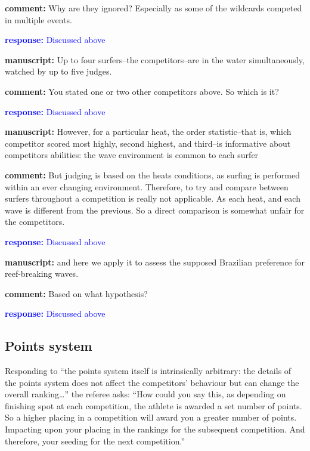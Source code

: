 \documentclass[12pt]{article}
\begin{document}
{\bf comment: } Why are they ignored? Especially as some of the wildcards competed in multiple events.

\textcolor{blue}{{\bf response: } Discussed above}


\rule{0mm}{10mm}


{\bf manuscript: } Up to four surfers--the competitors--are in the water simultaneously,
watched by up to five judges.

{\bf comment: } You stated one or two other competitors above. So which is it?

\textcolor{blue}{{\bf response: } Discussed above}

\rule{0mm}{10mm}


{\bf manuscript: } However, for a particular heat, the order statistic--that is, which
competitor scored most highly, second highest, and third--is
informative about competitors abilities: the wave environment is
common to each surfer

{\bf  comment: } But judging is based on the heats conditions, as surfing is performed
within an ever changing environment. Therefore, to try and compare
between surfers throughout a competition is really not applicable. As
each heat, and each wave is different from the previous. So a direct
comparison is somewhat unfair for the competitors.

\textcolor{blue}{{\bf response: } Discussed above}

\rule{0mm}{10mm}

{\bf manuscript: }  and here we apply it to assess the supposed Brazilian preference for
reef-breaking waves.

{\bf comment: } Based on what hypothesis?

\textcolor{blue}{{\bf response: } Discussed above}


\subsection*{Points system}

Responding to ``the points system itself is intrinsically arbitrary:
the details of the points system does not affect the competitors'
behaviour but can change the overall ranking\ldots'' the referee asks:
``How could you say this, as depending on finishing spot at each
competition, the athlete is awarded a set number of points. So a
higher placing in a competition will award you a greater number of
points. Impacting upon your placing in the rankings for the subsequent
competition. And therefore, your seeding for the next competition.''
\end{document}
